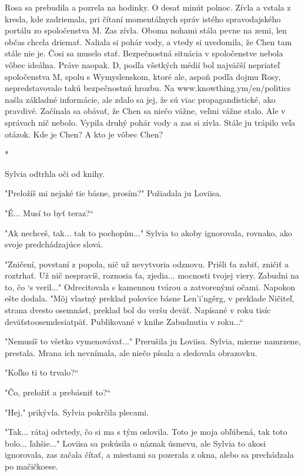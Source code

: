 \documentclass{book}
\begin{document}
Rosa sa prebudila a pozrela na hodinky. O desať minút polnoc. Zívla a vstala z kresla, kde zadriemala, pri čítaní momentálnych správ istého spravodajského portálu zo spoločenstva M. Zas zívla. Oboma nohami stála pevne na zemi, len občas chcela driemať. Naliala si pohár vody, a vtedy si uvedomila, že Chen tam stále nie je. Čosi sa muselo stať. Bezpečnostná situácia v spoločenstve nebola vôbec ideálna. Práve naopak. D, podľa všetkých médií bol najväčší nepriateľ spoločenstva M, spolu s Wymyslenskom, ktoré ale, aspoň podľa dojmu Rosy, nepredstavovalo takú bezpečnostnú hrozbu. Na www.knowthing.ym/en/politics našla základné informácie, ale zdalo sa jej, že sú viac propagandistické, ako pravdivé. Začínala sa obávať, že Chen sa niečo vážne, veľmi vážne stalo. Ale v správach nič nebolo. Vypila druhý pohár vody a zas si zívla. Stále ju trápilo veľa otázok. Kde je Chen? A kto je vôbec Chen?

\begin{center}

*

\end{center}

Sylvia odtrhla oči od knihy.

"$ $Preložíš mi nejaké tie básne, prosím?"$ $ Požiadala ju Loviisa.

"$ $É... Musí to byť teraz?“

"$ $Ak nechceš, tak... tak to pochopím..."$ $ Sylvia to akoby ignorovala, rovnako, ako svoje predchádzajúce slová.

"$ $Zničení, povstaní z popola, nič už nevytvoria odznovu. Prišli ťa zabiť, zničiť a roztrhať. Už nič nespravíš, roznosia ťa, zjedia... mocnosti tvojej viery. Zabudni na to, čo ‘s veril..."$ $ Odrecitovala s kamennou tvárou a zatvorenými očami. Napokon ešte dodala. "$ $Môj vlastný preklad polovice básne Len'i'nge\v{}rg, v preklade Ničiteľ, strana dvesto osemnásť, preklad bol do veršu deväť. Napísané v roku tisíc deväťstoosemdesiatpäť. Publikované v knihe Zabudnutia v roku...“

"$ $Nemusíš to všetko vymenovávať..."$ $ Prerušila ju Loviisa. Sylvia, mierne namrzene, prestala. Mrana ich nevnímala, ale niečo písala a sledovala obrazovku.

"$ $Koľko ti to trvalo?“

"$ $Čo, preložiť a prebásniť to?“

"$ $Hej,"$ $ prikývla. Sylvia pokrčila plecami.

"$ $Tak... rátaj odvtedy, čo si ma s tým oslovila. Toto je moja obľúbená, tak toto bolo... ľahšie..."$ $ Loviisa sa pokúsila o náznak úsmevu, ale Sylvia to akosi ignorovala, zas začala čítať, a miestami sa pozerala z okna, alebo sa prechádzala po mačičkoese.
\end{document}
